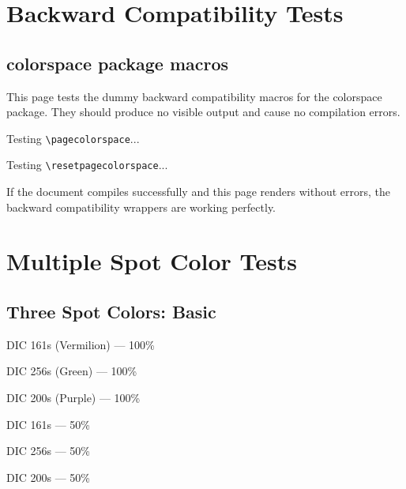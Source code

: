 \documentclass{article}\listfiles\pagestyle{empty}
\newcommand\onelineskip{\par\vspace{\baselineskip}\par}
\begin{document}
\clearpage

\section{Backward Compatibility Tests}

\subsection*{\textsf{colorspace} package macros}

This page tests the dummy backward compatibility macros for the \textsf{colorspace} package.
They should produce no visible output and cause no compilation errors.
\onelineskip

Testing \verb|\pagecolorspace|...
\onelineskip

Testing \verb|\resetpagecolorspace|...
\resetpagecolorspace %
\onelineskip

If the document compiles successfully and this page renders without errors, the backward compatibility wrappers are working perfectly.

\clearpage

\section{Multiple Spot Color Tests}

\subsection*{Three Spot Colors: Basic}

\textcolor{DIC161s}{DIC 161s (Vermilion) --- 100\%}\par
\textcolor{DIC256s}{DIC 256s (Green) --- 100\%}\par
\textcolor{DIC200s}{DIC 200s (Purple) --- 100\%}

\onelineskip

\textcolor{DIC161s!50}{DIC 161s --- 50\%}\par
\textcolor{DIC256s!50}{DIC 256s --- 50\%}\par
\textcolor{DIC200s!50}{DIC 200s --- 50\%}
\end{document}
